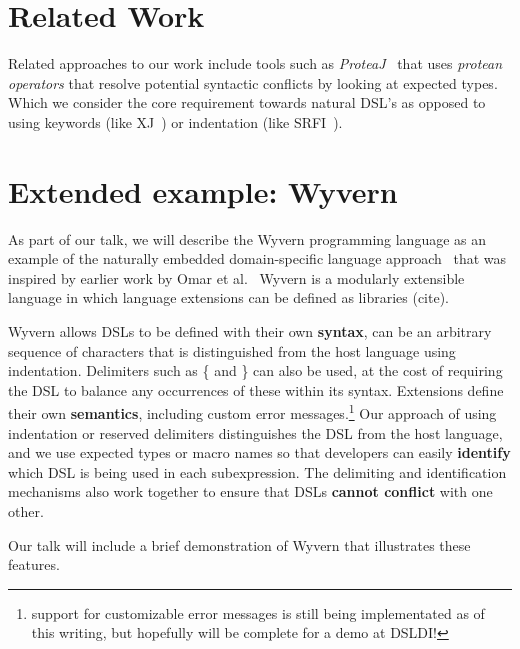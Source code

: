 \documentclass[preprint]{sigplanconf}
\begin{document}
\section{Related Work}

Related approaches to our work include tools such as \textit{ProteaJ}~\cite{Ichikawa:2014:CUO:2584469.2577092} that uses \textit{protean operators} that resolve potential syntactic conflicts by looking at expected types. Which we consider the core requirement towards natural DSL's as opposed to using keywords (like XJ~\cite{DBLP:conf/scam/ClarkSW08}) or indentation (like SRFI~\cite{srfi-49}).


\section{Extended example: Wyvern}

As part of our talk, we will describe the Wyvern programming language
as an example of the naturally embedded domain-specific language
approach~\cite{omar:2014:tsls} that was inspired by earlier work by Omar et al.~\cite{ACC_VLHCC}
Wyvern is a modularly extensible language in which language
extensions can be defined as libraries (cite).

Wyvern allows DSLs to be defined with their own \textbf{syntax}, can be
an arbitrary sequence of characters that is distinguished from the host
language using indentation.  Delimiters such as \{ and \} can also be
used, at the cost of requiring the DSL to balance any occurrences of
these within its syntax.  Extensions define their own \textbf{semantics},
including custom error messages.\footnote{support for customizable
error messages is still being implementated as of this writing, but
hopefully will be complete for a demo at DSLDI!}  Our approach of
using indentation or reserved delimiters distinguishes the DSL from
the host language, and we use expected types or macro names so that
developers can easily \textbf{identify} which DSL is being used in each
subexpression.  The delimiting and identification mechanisms also work
together to ensure that DSLs \textbf{cannot conflict} with one other.

Our talk will include a brief demonstration of Wyvern that illustrates
these features.




\end{document}
